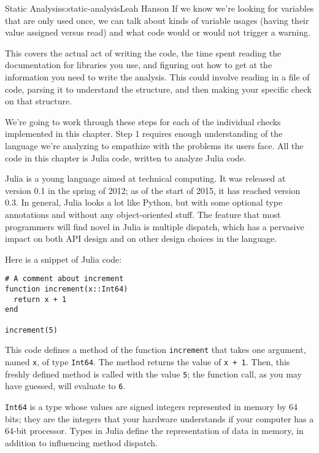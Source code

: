 \begin{aosachapter}{Static Analysis}{s:static-analysis}{Leah Hanson}
If we know we're looking for variables that are only used once, we can
talk about kinds of variable usages (having their value assigned versus
read) and what code would or would not trigger a warning.

\label{implementation-details.}

This covers the actual act of writing the code, the time spent reading
the documentation for libraries you use, and figuring out how to get at
the information you need to write the analysis. This could involve
reading in a file of code, parsing it to understand the structure, and
then making your specific check on that structure.

We're going to work through these steps for each of the individual
checks implemented in this chapter. Step 1 requires enough understanding
of the language we're analyzing to empathize with the problems its users
face. All the code in this chapter is Julia code, written to analyze
Julia code.

\label{a-very-brief-introduction-to-julia}

Julia is a young language aimed at technical computing. It was released
at version 0.1 in the spring of 2012; as of the start of 2015, it has
reached version 0.3. In general, Julia looks a lot like Python, but with
some optional type annotations and without any object-oriented stuff.
The feature that most programmers will find novel in Julia is multiple
dispatch, which has a pervasive impact on both API design and on other
design choices in the language.

Here is a snippet of Julia code:

\begin{verbatim}
# A comment about increment
function increment(x::Int64)
  return x + 1
end

increment(5)
\end{verbatim}

This code defines a method of the function \texttt{increment} that takes
one argument, named \texttt{x}, of type \texttt{Int64}. The method
returns the value of \texttt{x + 1}. Then, this freshly defined method
is called with the value \texttt{5}; the function call, as you may have
guessed, will evaluate to \texttt{6}.

\texttt{Int64} is a type whose values are signed integers represented in
memory by 64 bits; they are the integers that your hardware understands
if your computer has a 64-bit processor. Types in Julia define the
representation of data in memory, in addition to influencing method
dispatch.


\end{aosachapter}
